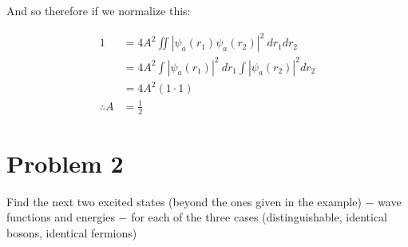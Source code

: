 \documentclass[10pt]{article}
\begin{document}
\begin{enumerate}[(a)]
\begin{solution}
            And so therefore if we normalize this:

            \begin{align*}
                1 &= 4A^2 \iint |\psi_a(r_1)\psi_a(r_2)|^2 \ dr_1 dr_2\\
                &= 4A^2 \int |\psi_a(r_1)|^2 \ dr_1 \int |\psi_a(r_2)|^2 dr_2\\
                &= 4A^2 (1 \cdot 1)\\
                \therefore A &= \frac 12
            \end{align*}
        \end{solution}
    \end{enumerate}


    \section*{Problem 2}
    Find the next two excited states (beyond the ones given in the example) $-$ wave functions and energies $-$ for each of the three cases (distinguishable, identical bosons, identical fermions)
        
\end{document}
